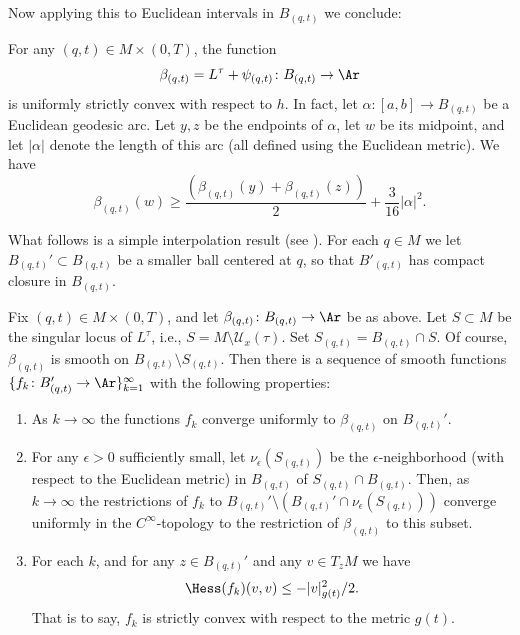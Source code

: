 Now applying this to Euclidean intervals in $B_{(q,t)}$ we conclude:

\begin{corollary}
\label{cor:l-tau-uniform-convexity}\label{lineineq}
For any $(q,t)\in M\times (0,T)$, the function
$$\beta_{(q,t)}=L^\tau+\psi_{(q,t)}\colon B_{(q,t)}\to\Ar$$ is
uniformly strictly convex with respect to $h$. In fact, let
$\alpha\colon [a,b]\to B_{(q,t)}$ be a Euclidean geodesic arc. Let
$y,z$ be the endpoints of $\alpha$, let $w$ be its midpoint, and let
$|\alpha|$ denote the length of this arc (all defined using the
Euclidean metric). We have
$$\beta_{(q,t)}(w)\ge \frac{\left(\beta_{(q,t)}(y)+\beta_{(q,t)}(z)\right)}{2}+\frac{3}{16}|\alpha|^2.$$
\end{corollary}

What follows is a simple interpolation result (see \cite{GreeneWu}).
For each $q\in M$ we let $B_{(q,t)}'\subset B_{(q,t)}$ be a smaller
ball centered at $q$, so that $B'_{(q,t)}$ has compact closure in
$B_{(q,t)}$.



\begin{claim}
\label{claim:smooth-convex-approximation}
Fix $(q,t)\in M\times(0,T)$, and let $\beta_{(q,t)}\colon B_{(q,t)}\to \Ar$ be
as above. Let $S\subset M$ be the singular locus of $L^\tau$, i.e.,
$S=M\setminus {\mathcal U}_{x}(\tau)$. Set $S_{(q,t)}=B_{(q,t)}\cap S$. Of
course, $\beta_{(q,t)}$ is smooth on $B_{(q,t)}\setminus S_{(q,t)}$. Then there
is a sequence of smooth functions $\{f_k\colon B'_{(q,t)}\to
\Ar\}_{k=1}^\infty$ with the following properties:
\begin{enumerate}
\item As $k\rightarrow \infty$ the functions $f_k$ converge uniformly to $\beta_{(q,t)}$ on
$B_{(q,t)}'$.
\item For any $\epsilon>0$ sufficiently small, let $\nu_\epsilon(S_{(q,t)})$ be the
$\epsilon$-neighborhood (with respect to the Euclidean metric) in
$B_{(q,t)}$ of $S_{(q,t)}\cap B_{(q,t)}$. Then, as $k\rightarrow
\infty$ the restrictions of $f_k$ to $B_{(q,t)}'\setminus
\left(B_{(q,t)}'\cap \nu_\epsilon(S_{(q,t)})\right)$ converge
uniformly in the $C^\infty$-topology to the restriction of
$\beta_{(q,t)}$ to this subset.
\item For each $k$, and for any $z\in B_{(q,t)}'$ and any $v\in T_zM$ we have
$$\Hess(f_k)(v,v)\le -|v|_{g(t)}^2/2.$$
That is to say, $f_k$ is strictly convex with respect to the metric
$g(t)$.
\end{enumerate}
\end{claim}

